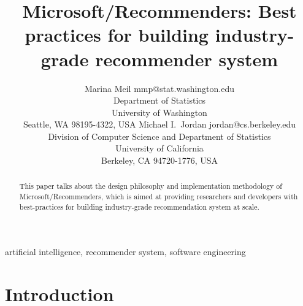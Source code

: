 \documentclass[twoside,11pt]{article}
\begin{document}
\title{Microsoft/Recommenders: Best practices for building industry-grade recommender system}

\author{\name Marina Meil \email mmp@stat.washington.edu \\
       \addr Department of Statistics\\
       University of Washington\\
       Seattle, WA 98195-4322, USA
       \AND
       \name Michael I.\ Jordan \email jordan@cs.berkeley.edu \\
       \addr Division of Computer Science and Department of Statistics\\
       University of California\\
       Berkeley, CA 94720-1776, USA}


\maketitle

\begin{abstract}%
  This paper talks about the design philosophy and implementation methodology of Microsoft/Recommenders, which is aimed at providing researchers and developers with best-practices for building  industry-grade recommendation system at scale.
\end{abstract}

\begin{keywords}
  artificial intelligence, recommender system, software engineering
\end{keywords}

\section{Introduction}
\end{document}
